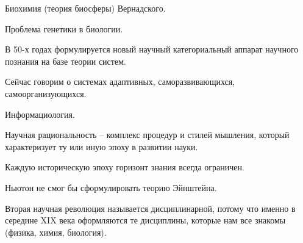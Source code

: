 \documentclass[main.tex]{subfiles}
\begin{document}
Биохимия (теория биосферы) Вернадского.

Проблема генетики в биологии.

В 50-х годах формулируется новый научный категориальный аппарат научного познания на базе теории систем.

Сейчас говорим о системах адаптивных, саморазвивающихся, самоорганизующихся.

Информациология.



Научная рациональность -- комплекс процедур и стилей мышления, который характеризует ту или иную эпоху в развитии науки.

Каждую историческую эпоху горизонт знания всегда ограничен.

Ньютон не смог бы сформулировать теорию Эйнштейна.





Вторая научная революция называется дисциплинарной, потому что именно в середине XIX века оформляются те дисциплины, которые нам все знакомы (физика, химия, биология).

\end{document}
